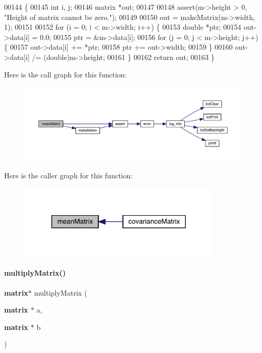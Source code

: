\begin{DoxyCode}
00144                               \{
00145   \textcolor{keywordtype}{int} i, j;
00146   matrix *out;
00147 
00148   assert(m->height > 0, \textcolor{stringliteral}{"Height of matrix cannot be zero."});
00149 
00150   out = makeMatrix(m->width, 1);
00151 
00152   \textcolor{keywordflow}{for} (i = 0; i < m->width; i++) \{
00153     \textcolor{keywordtype}{double} *ptr;
00154     out->data[i] = 0.0;
00155     ptr = &m->data[i];
00156     \textcolor{keywordflow}{for} (j = 0; j < m->height; j++) \{
00157       out->data[i] += *ptr;
00158       ptr += out->width;
00159     \}
00160     out->data[i] /= (double)m->height;
00161   \}
00162   \textcolor{keywordflow}{return} out;
00163 \}
\end{DoxyCode}
Here is the call graph for this function\+:
\nopagebreak
\begin{figure}[H]
\begin{center}
\leavevmode
\includegraphics[width=350pt]{matrix_8c_ae4babf9b518a2d5d6b12776191e3b7de_cgraph}
\end{center}
\end{figure}
Here is the caller graph for this function\+:
\nopagebreak
\begin{figure}[H]
\begin{center}
\leavevmode
\includegraphics[width=276pt]{matrix_8c_ae4babf9b518a2d5d6b12776191e3b7de_icgraph}
\end{center}
\end{figure}
\mbox{\label{matrix_8c_a63ed5c518b34768e9ef8e9d5f7d0b534}} 
\paragraph{multiply\+Matrix()}
{\footnotesize\ttfamily \textbf{ matrix}$\ast$ multiply\+Matrix (\begin{DoxyParamCaption}\item[{\textbf{ matrix} $\ast$}]{a,  }\item[{\textbf{ matrix} $\ast$}]{b }\end{DoxyParamCaption})}



